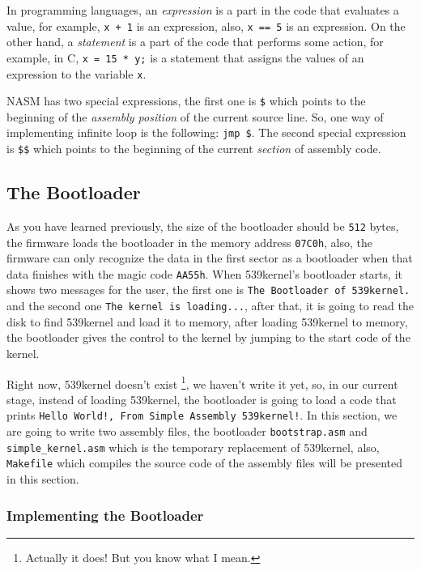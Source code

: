 In programming languages, an \emph{expression} is a part in the code
that evaluates a value, for example, \lstinline!x + 1! is an expression,
also, \lstinline!x == 5! is an expression. On the other hand, a
\emph{statement} is a part of the code that performs some action, for
example, in C, \lstinline!x = 15 * y;! is a statement that assigns the
values of an expression to the variable \lstinline!x!.

NASM has two special expressions, the first one is \lstinline!$! which
points to the beginning of the \emph{assembly position} of the current
source line. So, one way of implementing infinite loop is the following:
\lstinline!jmp $!. The second special expression is \lstinline!$$! which
points to the beginning of the current \emph{section} of assembly code.

\subsection{The Bootloader}\label{the-bootloader}

As you have learned previously, the size of the bootloader should be
\lstinline!512! bytes, the firmware loads the bootloader in the memory
address \lstinline!07C0h!, also, the firmware can only recognize the
data in the first sector as a bootloader when that data finishes with
the magic code \lstinline!AA55h!. When 539kernel's bootloader starts, it
shows two messages for the user, the first one is
\lstinline!The Bootloader of 539kernel.! and the second one
\lstinline!The kernel is loading...!, after that, it is going to read
the disk to find 539kernel and load it to memory, after loading
539kernel to memory, the bootloader gives the control to the kernel by
jumping to the start code of the kernel.

Right now, 539kernel doesn't exist \footnote{Actually it does! But you
  know what I mean.}, we haven't write it yet, so, in our current stage,
instead of loading 539kernel, the bootloader is going to load a code
that prints \lstinline"Hello World!, From Simple Assembly 539kernel!".
In this section, we are going to write two assembly files, the
bootloader \lstinline!bootstrap.asm! and \lstinline!simple_kernel.asm!
which is the temporary replacement of 539kernel, also,
\lstinline!Makefile! which compiles the source code of the assembly
files will be presented in this section.

\subsubsection{Implementing the
Bootloader}\label{implementing-the-bootloader}

